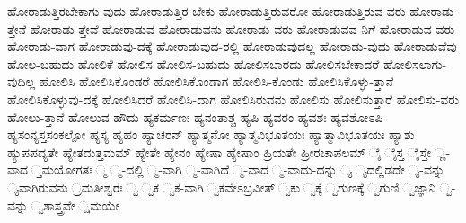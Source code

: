 {ಹೋರಾಡುತ್ತಿರಬೇಕಾಗು-ವುದು
ಹೋರಾಡುತ್ತಿರ-ಬೇಕು
ಹೋರಾಡುತ್ತಿರುವರೋ
ಹೋರಾಡುತ್ತಿರುವ-ವರು
ಹೋರಾಡು-ತ್ತೇನೆ
ಹೋರಾಡು-ತ್ತೇವೆ
ಹೋರಾಡುವ
ಹೋರಾಡುವನು
ಹೋರಾಡು-ವರು
ಹೋರಾಡುವವ-ನಿಗೆ
ಹೋರಾಡುವ-ವರು
ಹೋರಾಡು-ವಾಗ
ಹೋರಾಡುವು-ದಕ್ಕೆ
ಹೋರಾಡುವುದ-ರಲ್ಲಿ
ಹೋರಾಡುವುದಲ್ಲ
ಹೋರಾಡು-ವುದು
ಹೋರಾಡುವೆವು
ಹೋಲ-ಬಹುದು
ಹೋಲಿಕೆ
ಹೋಲಿಸ
ಹೋಲಿಸ-ಬಹುದು
ಹೋಲಿಸಬಾರದು
ಹೋಲಿಸಬೇಕಾದರೆ
ಹೋಲಿಸಲಾಗು-ವುದಿಲ್ಲ
ಹೋಲಿಸಿ
ಹೋಲಿಸಿಕೊಂಡರೆ
ಹೋಲಿಸಿಕೊಂಡಾಗ
ಹೋಲಿಸಿ-ಕೊಂಡು
ಹೋಲಿಸಿಕೊಳ್ಳು-ತ್ತಾನೆ
ಹೋಲಿಸಿಕೊಳ್ಳುವು-ದಕ್ಕೆ
ಹೋಲಿಸಿದರೆ
ಹೋಲಿಸಿ-ದಾಗ
ಹೋಲಿಸಿರುವನು
ಹೋಲಿಸು
ಹೋಲಿಸುತ್ತಾರೆ
ಹೋಲಿಸು-ವರು
ಹೋಲು-ತ್ತಾನೆ
ಹೋಲುವ
ಹೌದು
ಹ್ಯಕರ್ಮಣಃ
ಹ್ಯನಂತಾಶ್ಚ
ಹ್ಯಪಿ
ಹ್ಯವರಂ
ಹ್ಯವಶಃ
ಹ್ಯವಶೋಽಪಿ
ಹ್ಯಸಂನ್ಯಸ್ತಸಂಕಲ್ಪೋ
ಹ್ಯಸ್ಯ
ಹ್ಯಹಂ
ಹ್ಯಾಚರನ್
ಹ್ಯಾತ್ಮನೋ
ಹ್ಯಾತ್ಮವಿಭೂತಯಃ
ಹ್ಯಾತ್ಮಾವಿಭೂತಯಃ
ಹ್ಯಾಶು
ಹ್ಯುಪಪದ್ಯತೇ
ಹ್ಯೇತದುತ್ತಮಮ್
ಹ್ಯೇತೇ
ಹ್ಯೇನಂ
ಹ್ಯೇಷಾ
ಹ್ಯೇಷಾಂ
ಹ್ರಿಯತೇ
ಹ್ರೀರಚಾಪಲಮ್
ೈ
ೈಸ್ತ
ೈಸ್ತೇ
್ಣ-ವಾದ
್ತಮಯೋಗತಃ
್ಮ
್ಮ-ದಲ್ಲಿ
್ಮ-ವಾಗಿ
್ಮ-ವಾಗಿದೆ
್ಮ-ವಾದ
್ಮ-ವಾದು-ದನ್ನು
್ಯ
್ಯದಲ್ಲಿಡದೇ
್ಯ-ವನ್ನು
್ಯವಾಗಿರುವನು
್ರಮತೀಶ್ವರಃ
್ವ
್ವಕ
್ವಕ-ವಾಗಿ
್ವಕವೇಽಬ್ರವೀತ್
್ವಕು
್ವಕ್ಕೆ
್ವಗುಣಕ್ಕೆ
್ವಗುಣಿ
್ವಜ್ಞಾನಿ
್ವ-ವನ್ನು
್ವಶಾಸ್ತ್ರವೇ
್ಷಮಯೇ
}
